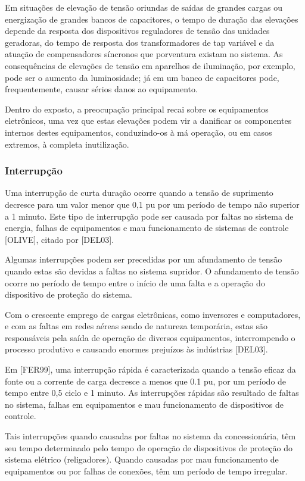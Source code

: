 Em situações de elevação de tensão oriundas de saídas de grandes cargas ou energização de grandes bancos de capacitores, o tempo de duração das elevações depende da resposta dos dispositivos reguladores de tensão das unidades geradoras, do tempo de resposta dos transformadores de tap variável e da atuação de compensadores síncronos que porventura existam no sistema. As consequências de elevações de tensão em aparelhos de iluminação, por exemplo, pode ser o aumento da luminosidade; já em um banco de capacitores pode, frequentemente, causar sérios danos ao equipamento.
\par
Dentro do exposto, a preocupação principal recai sobre os equipamentos eletrônicos, uma vez que estas elevações podem vir a danificar os componentes internos destes equipamentos, conduzindo-os à má operação, ou em casos extremos, à completa inutilização.

\subsubsection{Interrupção}
\par
Uma interrupção de curta duração ocorre quando a tensão de suprimento decresce para um valor menor que 0,1 pu por um período de tempo não superior a 1 minuto. Este tipo de interrupção pode ser causada por faltas no sistema de energia, falhas de equipamentos e mau funcionamento de sistemas de controle [OLIVE], citado por [DEL03].
\par
Algumas interrupções podem ser precedidas por um afundamento de tensão quando estas são devidas a faltas no sistema supridor. O afundamento de tensão ocorre no período de tempo entre o início de uma falta e a operação do dispositivo de proteção do sistema.
\par
Com o crescente emprego de cargas eletrônicas, como inversores e computadores, e com as faltas em redes aéreas sendo de natureza temporária, estas são responsáveis pela saída de operação de diversos equipamentos, interrompendo o processo produtivo e causando enormes prejuízos às indústrias [DEL03].
\par
Em [FER99], uma interrupção rápida é caracterizada quando a tensão eficaz da fonte ou a corrente de carga decresce a menos que 0.1 pu, por um período de tempo entre 0,5 ciclo e 1 minuto. As interrupções rápidas são resultado de faltas no sistema, falhas em equipamentos e mau funcionamento de dispositivos de controle.
\par
Tais interrupções quando causadas por faltas no sistema da concessionária, têm seu tempo determinado pelo tempo de operação de dispositivos de proteção do sistema elétrico (religadores). Quando causadas por mau funcionamento de equipamentos ou por falhas de conexões, têm um período de tempo irregular.

